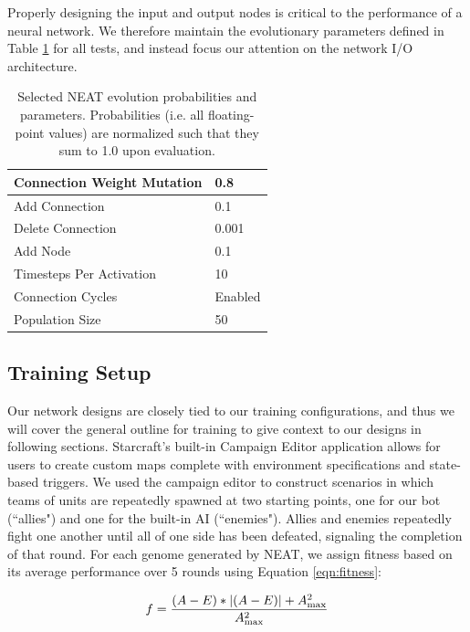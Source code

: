 \documentclass[10pt,a4paper,twocolumn]{article}
\begin{document}
Properly designing the input and output nodes is critical to the performance of a neural network. We therefore maintain the evolutionary parameters defined in Table \ref{tab:neat_params_specific} for all tests, and instead focus our attention on the network I/O architecture.

\begin{table}
\centering
\begin{tabular}{|l|l|}
	\hline
	Connection Weight Mutation & 0.8\\ \hline
	Add Connection & 0.1\\ \hline
	Delete Connection & 0.001\\ \hline
	Add Node & 0.1\\ \hline
	Timesteps Per Activation & 10\\ \hline
	Connection Cycles & Enabled \\ \hline
	Population Size & 50 \\ \hline
\end{tabular}
\caption{Selected NEAT evolution probabilities and parameters. Probabilities (i.e. all floating-point values) are normalized such that they sum to 1.0 upon evaluation.}
\label{tab:neat_params_specific}
\end{table}

\subsection{Training Setup}

Our network designs are closely tied to our training configurations, and thus we will cover the general outline for training to give context to our designs in following sections. Starcraft's built-in Campaign Editor application allows for users to create custom maps complete with environment specifications and state-based triggers. We used the campaign editor to construct scenarios in which teams of units are repeatedly spawned at two starting points, one for our bot (``allies") and one for the built-in AI (``enemies"). Allies and enemies repeatedly fight one another until all of one side has been defeated, signaling the completion of that round. For each genome generated by NEAT, we assign fitness based on its average performance over 5 rounds using Equation \ref{eqn:fitness}:

\begin{equation}
f = \frac{(A - E) * |(A - E)| + A_\mathrm{max}^2}{A_\mathrm{max}^2}\\
\label{eqn:fitness}
\end{equation}
\end{document}
